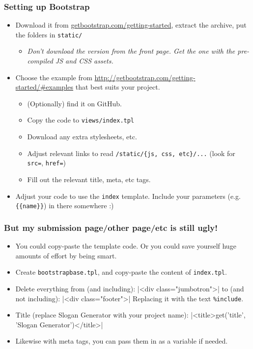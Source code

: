 \documentclass{beamer}
\begin{document}
\begin{frame}[fragile]
\frametitle{Setting up Bootstrap}
\begin{itemize}
\item Download it from \url{getbootstrap.com/getting-started}, extract
  the archive, put the folders in \texttt{static/}
  \begin{itemize}
  \item \emph{Don't download the version from the front page. Get the
      one with the pre-compiled JS and CSS assets.}
  \end{itemize}
  \item Choose the example from
    \url{http://getbootstrap.com/getting-started/#examples} that best
    suits your project.
    \begin{itemize}
      \item (Optionally) find it on GitHub.
      \item Copy the code to \texttt{views/index.tpl}
      \item Download any extra stylesheets, etc.
      \item Adjust relevant links to read \texttt{/static/\{js, css,
          etc\}/...} (look for \texttt{src=}, \texttt{href=})
      \item Fill out the relevant title, meta, etc tags.
    \end{itemize}
  \item Adjust your code to use the \texttt{index} template. Include
    your parameters (e.g. \texttt{\{\{name\}\}}) in there somewhere :)
  \end{itemize}
\end{frame}

\begin{frame}[fragile]
  \frametitle{But my submission page/other page/etc is still ugly!}
  \begin{itemize}
  \item You could copy-paste the template code. Or you could save
    yourself huge amounts of effort by being smart.
  \item Create \texttt{bootstrapbase.tpl}, and copy-paste the content
    of \texttt{index.tpl}.
  \item Delete everything from (and including):
|<div class="jumbotron">|
to (and not including):
|<div class="footer">|
Replacing it with the text \texttt{\%include}.
\item Title (replace Slogan Generator with your project name):
|<title>{{get('title', 'Slogan Generator')}}</title>|
\item Likewise with meta tags, you can pass them in as a variable if
  needed.
  \end{itemize}
\end{frame}
\end{document}
